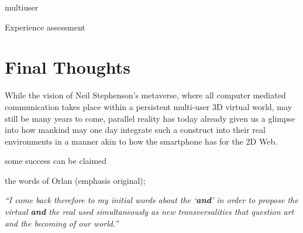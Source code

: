 multiuser

Experience assessment



\section{Final Thoughts}

While the vision of Neil Stephenson's metaverse, where all computer mediated communication takes place within a persistent multi-user 3D virtual world, may still be many years to come, parallel reality has today already given us a glimpse into how mankind may one day integrate such a construct into their real environments in a manner akin to how the smartphone has for the 2D Web.

some success can be claimed



the words of Orlan (emphasis original);

\textit{``I come back therefore to my initial words about the `\textbf{and}' in order to propose the virtual \textbf{and} the real used simultaneously as new transversalities that question art and the becoming of our world.''}~\cite{Orlan2002}

